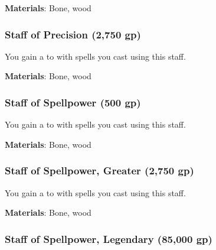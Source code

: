 \vspace{0.25em}
\textbf{Materials}: Bone, wood


\lowercase{\hypertarget{item:Staff of Precision}{}}\label{item:Staff of Precision}
\hypertarget{item:Staff of Precision}{\subsubsection{Staff of Precision\hfill{} (2,750 gp)}}

You gain a   to  with spells you cast using this staff.



\vspace{0.25em}
\textbf{Materials}: Bone, wood


\lowercase{\hypertarget{item:Staff of Spellpower}{}}\label{item:Staff of Spellpower}
\hypertarget{item:Staff of Spellpower}{\subsubsection{Staff of Spellpower\hfill{} (500 gp)}}

You gain a   to  with spells you cast using this staff.



\vspace{0.25em}
\textbf{Materials}: Bone, wood


\lowercase{\hypertarget{item:Staff of Spellpower, Greater}{}}\label{item:Staff of Spellpower, Greater}
\hypertarget{item:Staff of Spellpower, Greater}{\subsubsection{Staff of Spellpower, Greater\hfill{} (2,750 gp)}}

You gain a   to  with spells you cast using this staff.



\vspace{0.25em}
\textbf{Materials}: Bone, wood


\lowercase{\hypertarget{item:Staff of Spellpower, Legendary}{}}\label{item:Staff of Spellpower, Legendary}
\hypertarget{item:Staff of Spellpower, Legendary}{\subsubsection{Staff of Spellpower, Legendary\hfill{} (85,000 gp)}}

